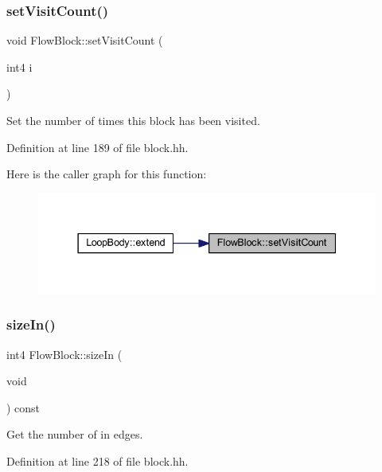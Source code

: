 \subsubsection{\texorpdfstring{setVisitCount()}{setVisitCount()}}
{\footnotesize\ttfamily void Flow\+Block\+::set\+Visit\+Count (\begin{DoxyParamCaption}\item[{int4}]{i }\end{DoxyParamCaption})\hspace{0.3cm}{\ttfamily [inline]}}



Set the number of times this block has been visited. 



Definition at line 189 of file block.\+hh.

Here is the caller graph for this function\+:
\nopagebreak
\begin{figure}[H]
\begin{center}
\leavevmode
\includegraphics[width=337pt]{class_flow_block_a55c52137e9aff59348f026f17d9801f0_icgraph}
\end{center}
\end{figure}
\mbox{\label{class_flow_block_aab379442c099264f10c1f1f3b9ecf5fe}} 
\subsubsection{\texorpdfstring{sizeIn()}{sizeIn()}}
{\footnotesize\ttfamily int4 Flow\+Block\+::size\+In (\begin{DoxyParamCaption}\item[{void}]{ }\end{DoxyParamCaption}) const\hspace{0.3cm}{\ttfamily [inline]}}



Get the number of in edges. 



Definition at line 218 of file block.\+hh.

